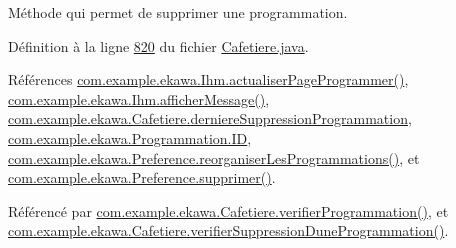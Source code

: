 Méthode qui permet de supprimer une programmation. 



Définition à la ligne \hyperlink{_cafetiere_8java_source_l00820}{820} du fichier \hyperlink{_cafetiere_8java_source}{Cafetiere.\+java}.



Références \hyperlink{_ihm_8java_source_l00938}{com.\+example.\+ekawa.\+Ihm.\+actualiser\+Page\+Programmer()}, \hyperlink{_ihm_8java_source_l00964}{com.\+example.\+ekawa.\+Ihm.\+afficher\+Message()}, \hyperlink{_cafetiere_8java_source_l00078}{com.\+example.\+ekawa.\+Cafetiere.\+derniere\+Suppression\+Programmation}, \hyperlink{_programmation_8java_source_l00025}{com.\+example.\+ekawa.\+Programmation.\+ID}, \hyperlink{_preference_8java_source_l00157}{com.\+example.\+ekawa.\+Preference.\+reorganiser\+Les\+Programmations()}, et \hyperlink{_preference_8java_source_l00132}{com.\+example.\+ekawa.\+Preference.\+supprimer()}.



Référencé par \hyperlink{_cafetiere_8java_source_l00606}{com.\+example.\+ekawa.\+Cafetiere.\+verifier\+Programmation()}, et \hyperlink{_cafetiere_8java_source_l00804}{com.\+example.\+ekawa.\+Cafetiere.\+verifier\+Suppression\+Dune\+Programmation()}.


